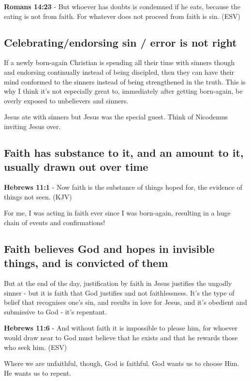 \documentclass[11pt]{article}
\begin{document}
\textbf{Romans 14:23} - But whoever has doubts is condemned if he eats, because the eating is not from faith. For whatever does not proceed from faith is sin. (ESV)

\subsection{Celebrating/endorsing sin / error is not right}
\label{sec:orgaf70b3b}

If a newly born-again Christian is spending all their time with sinners though and endorsing continually instead of being discipled, then they can
have their mind conformed to the sinners instead of being strengthened in the truth. This is why I think it's not especially great to, immediately after getting born-again,
be overly exposed to unbelievers and sinners.

Jesus ate with sinners but Jesus was the special guest. Think of Nicodemus inviting Jesus over.

\subsection{Faith has substance to it, and an amount to it, usually drawn out over time}
\label{sec:orgff68340}
\textbf{Hebrews 11:1} - Now faith is the substance of things hoped for, the evidence of things not seen. (KJV)

For me, I was acting in faith ever since I was born-again, resulting in a huge chain of events and confirmations!

\subsection{Faith believes God and hopes in invisible things, and is convicted of them}
\label{sec:orgd322dc7}

But at the end of the day, justification by faith in Jesus justifies the ungodly sinner - but it is faith that God justifies and not faithlessness. It's the type of belief that recognises one's sin, and results in love for Jesus, and it's obedient and submissive to God - it's repentant.

\textbf{Hebrews 11:6} - And without faith it is impossible to please him, for whoever would draw near to God must believe that he exists and that he rewards those who seek him. (ESV)

Where we are unfaithful, though, God is faithful. God wants us to choose Him. He wants us to repent.
\end{document}
